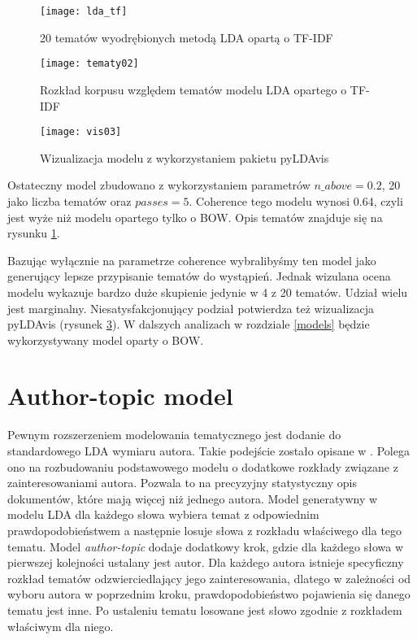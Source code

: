 \documentclass[a4paper,11pt,twoside]{report}
\theoremstyle{definition}
\begin{document}
\begin{figure}
\texttt{[image: lda\_tf]} 
\centering \caption{20 tematów wyodrębionych metodą LDA opartą o TF-IDF}
 \label{lda_tf}
\end{figure}


\begin{figure}
\texttt{[image: tematy02]} 
\centering \caption{Rozkład korpusu względem tematów modelu LDA opartego o TF-IDF}
 \label{top_dist02}
\end{figure}

\begin{figure}
\texttt{[image: vis03]} 
\centering \caption{Wizualizacja modelu z wykorzystaniem pakietu pyLDAvis}
 \label{vis03}
\end{figure}

Ostateczny model zbudowano z wykorzystaniem parametrów $n\_above=0.2$, 20 jako liczba tematów oraz $passes=5$. Coherence tego modelu wynosi 0.64, czyli jest wyże niż modelu opartego tylko o BOW. Opis tematów znajduje się na rysunku \ref{lda_tf}. 

Bazując wyłącznie na parametrze coherence wybralibyśmy ten model jako generujący lepsze przypisanie tematów do wystąpień. Jednak wizulana ocena modelu wykazuje bardzo duże skupienie jedynie w 4 z 20 tematów. Udział wielu jest marginalny. Niesatysfakcjonujący podział potwierdza też wizualizacja pyLDAvis (rysunek \ref{vis03}). W dalszych analizach w rozdziale \ref{models} będzie wykorzystywany model oparty o BOW.








\section{Author-topic model}
Pewnym rozszerzeniem modelowania tematycznego jest dodanie do standardowego LDA wymiaru autora. Takie podejście zostało opisane w \cite{ATM}. Polega ono na rozbudowaniu podstawowego modelu o dodatkowe rozkłady związane z zainteresowaniami autora. Pozwala to na precyzyjny statystyczny opis dokumentów, które mają więcej niż jednego autora. Model generatywny w modelu LDA dla każdego słowa wybiera temat z odpowiednim prawdopodobieństwem a następnie losuje słowa z rozkładu właściwego dla tego tematu. Model \textit{author-topic} dodaje dodatkowy krok, gdzie dla każdego słowa w pierwszej kolejności ustalany jest autor. Dla każdego autora istnieje specyficzny rozkład tematów odzwierciedlający jego zainteresowania, dlatego w zależności od wyboru autora w poprzednim kroku, prawdopodobieństwo pojawienia się danego tematu jest inne. Po ustaleniu tematu losowane jest słowo zgodnie z rozkładem właściwym dla niego.
\end{document}
